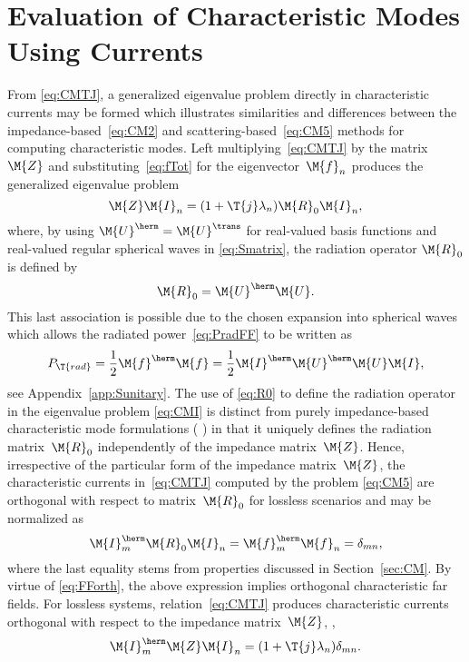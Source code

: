 \documentclass[journal]{IEEEtran}
\providecommand{\Umat}{\M{U}} %
\begin{document}
\section{Evaluation of Characteristic Modes Using Currents}\label{S:CMI}

From \eqref{eq:CMTJ},  a generalized eigenvalue problem directly in characteristic currents may be formed which illustrates similarities and differences between the impedance-based~\eqref{eq:CM2} and scattering-based~\eqref{eq:CM5} methods for computing characteristic modes. Left multiplying~\eqref{eq:CMTJ} by the matrix $\M{Z}$ and substituting~\eqref{eq:fTot} for the eigenvector~$\M{f}_n$ produces the generalized eigenvalue problem 
\begin{equation}
    \label{eq:CMI}
    \M{Z}\M{I}_n = (1 + \T{j}\lambda_n) \M{R}_0\M{I}_n,
\end{equation}
where, by using $\M{U}^\herm=\M{U}^\trans$ for real-valued basis functions and real-valued regular spherical waves in \eqref{eq:Smatrix}, the radiation operator $\M{R}_0$ is defined by
\begin{equation}
\label{eq:R0}
    \M{R}_0 = \Umat^\herm \Umat.
\end{equation}
This last association is possible due to the chosen expansion into spherical waves which allows the radiated power~\eqref{eq:PradFF} to be written as
\begin{equation}
    P_\T{rad} = \frac{1}{2} \M{f}^\herm \M{f}
    =\frac{1}{2} \M{I}^\herm \Umat^\herm\Umat \M{I},
\end{equation}
see Appendix~\ref{app:Sunitary}.  The use of \eqref{eq:R0} to define the radiation operator in the eigenvalue problem \eqref{eq:CMI} is distinct from purely impedance-based characteristic mode formulations (\eg{} \cite{HarringtonMautz_ComputationOfCharacteristicModesForConductingBodies}) in that it uniquely defines the radiation matrix~$\M{R}_0$ independently of the impedance matrix~$\M{Z}$. Hence, irrespective of the particular form of the impedance matrix~$\M{Z}$, the characteristic currents in~\eqref{eq:CMTJ} computed by the problem \eqref{eq:CM5} are orthogonal with respect to matrix~$\M{R}_0$ for lossless scenarios and may be normalized as
\begin{equation}
\label{eq:IRI}
\M{I}_m^\herm \M{R}_0 \M{I}_n = \M{f}_m^\herm \M{f}_n = \delta_{mn},
\end{equation}
where the last equality stems from properties discussed in Section~\ref{sec:CM}. By virtue of \eqref{eq:FForth}, the above expression implies orthogonal characteristic far fields.  For lossless systems, relation~\eqref{eq:CMTJ}  produces characteristic currents orthogonal with respect to the impedance matrix~$\M{Z}$, \ie{},
\begin{equation}
\label{eq:IZI}
\M{I}_m^\herm \M{Z} \M{I}_n = (1 + \T{j}\lambda_n) \delta_{mn}.
\end{equation}
\end{document}
